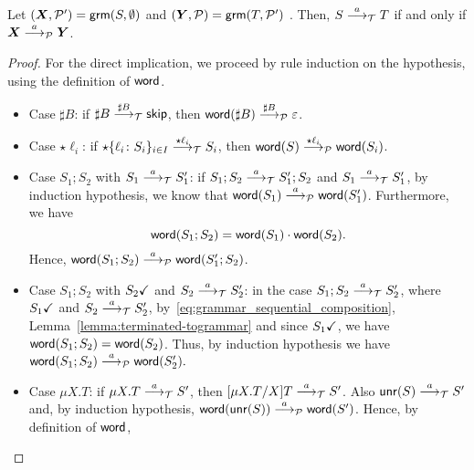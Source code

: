 \newcommand{\grmcontext}{
  $(\vec X, \productions') = \grm(S, \emptyset)$ and 
  $(\vec Y, \productions) = \grm(T, \productions')$%
}

\begin{lemma}
  \label{lem:transitions_mimic}
  Let \grmcontext. Then, 
  $S \LTSderives T$ if and only if $\vec X \LTSderivesP \vec Y$.
\end{lemma}
%
\begin{proof}
	For the direct implication, we proceed by rule induction on the
	hypothesis, using the definition of $\word$.
	
	\begin{itemize}
		\item Case $\sharp B$: if $\sharp B \LTSderives[\sharp B] \skipk$, then 
			$\word(\sharp B) \LTSderivesP[\sharp B] \varepsilon$.
		\item Case $\star \ell_i$: if
		$\star\{\ell_i\colon S_i\}_{i\in I} \LTSderives[\star \ell_i] S_i$, then
		$\word(S) \LTSderivesP[\star \ell_i] \word(S_i)$.
		\item Case $S_1;S_2$ with $S_1\LTSderives S_1'$:
		if $S_1;S_2\LTSderives S_1';S_2$ and $S_1\LTSderives S_1'$,
			by induction hypothesis, we know that $\word(S_1) \LTSderivesP \word(S_1')$.
			Furthermore, we have
			\begin{equation}
			\label{eq:grammar_sequential_composition}
				\word(S_1;S_2) = \word(S_1)\cdot\word(S_2).	
			\end{equation}
			Hence, $\word(S_1;S_2) \LTSderivesP \word(S_1';S_2)$.
		\item Case $S_1;S_2$ with $\DONE{S_2}$ and $S_2\LTSderives S_2'$: 
			in the case $S_1;S_2\LTSderives S_2'$, where
			$\DONE{S_1}$ and $S_2\LTSderives S_2'$, 
			by~\eqref{eq:grammar_sequential_composition},
			Lemma~\ref{lemma:terminated-togrammar} and since $\DONE{S_1}$, 
			we have $\word(S_1;S_2) = \word(S_2)$.
			Thus, by induction hypothesis we have 
			$\word(S_1;S_2) \LTSderivesP \word(S_2').$
		\item Case $\mu X.T$: if $\mu X.T\LTSderives S'$, 
			then $\subs {\mu X. T}{X}{T} \LTSderives S'$. Also
			$\Unravel(S) \LTSderives S'$ and, by induction hypothesis,
			$\word(\Unravel(S))\LTSderivesP \word(S')$. Hence, by 
			definition of $\word$, 

\end{itemize}
\end{proof}
